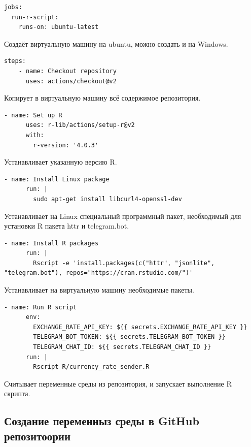 \documentclass[
]{book}
\begin{document}
\begin{verbatim}
jobs:
  run-r-script:
    runs-on: ubuntu-latest
\end{verbatim}

Создаёт виртуальную машину на ubuntu, можно создать и на Windows.

\begin{verbatim}
steps:
    - name: Checkout repository
      uses: actions/checkout@v2
\end{verbatim}

Копирует в виртуальную машину всё содержимое репозитория.

\begin{verbatim}
- name: Set up R
      uses: r-lib/actions/setup-r@v2
      with:
        r-version: '4.0.3'
\end{verbatim}

Устанавливает указанную версию R.

\begin{verbatim}
- name: Install Linux package
      run: |
        sudo apt-get install libcurl4-openssl-dev
\end{verbatim}

Устанавливает на Linux специальный программный пакет, необходимый для установки R пакета httr и telegram.bot.

\begin{verbatim}
- name: Install R packages
      run: |
        Rscript -e 'install.packages(c("httr", "jsonlite", "telegram.bot"), repos="https://cran.rstudio.com/")'
\end{verbatim}

Устанавливает на виртуальную машину необходимые пакеты.

\begin{verbatim}
- name: Run R script
      env:
        EXCHANGE_RATE_API_KEY: ${{ secrets.EXCHANGE_RATE_API_KEY }}
        TELEGRAM_BOT_TOKEN: ${{ secrets.TELEGRAM_BOT_TOKEN }}
        TELEGRAM_CHAT_ID: ${{ secrets.TELEGRAM_CHAT_ID }}
      run: |
        Rscript R/currency_rate_sender.R
\end{verbatim}

Считывает переменные среды из репозитория, и запускает выполнение R скрипта.

\subsection{Создание переменныз среды в GitHub репозитоории}\label{ux441ux43eux437ux434ux430ux43dux438ux435-ux43fux435ux440ux435ux43cux435ux43dux43dux44bux437-ux441ux440ux435ux434ux44b-ux432-github-ux440ux435ux43fux43eux437ux438ux442ux43eux43eux440ux438ux438}
\end{document}
